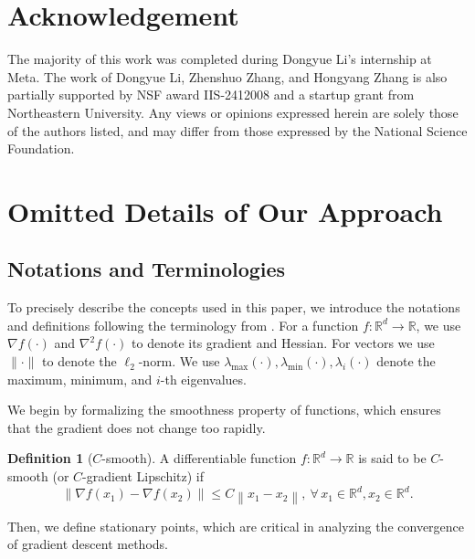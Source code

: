 \documentclass{article}
\theoremstyle{definition}
\newtheorem{definition}[theorem]{Definition}
\newcommand{\bignorm}[1]{\left\| #1 \right\|}
\begin{document}
\section*{Acknowledgement}
 
The majority of this work was completed during Dongyue Li's internship at Meta.
The work of Dongyue Li, Zhenshuo Zhang, and Hongyang Zhang is also partially supported by NSF award IIS-2412008 and a startup grant from Northeastern University. Any views or opinions expressed herein are solely those of the authors listed, and may differ from those expressed by the National Science Foundation.












\newpage
\appendix
\onecolumn
\section{Omitted Details of Our Approach}\label{sec_approach_details}

\subsection{Notations and Terminologies}

To precisely describe the concepts used in this paper, we introduce the notations and definitions following the terminology from \cite{jin2017escape}.   
For a function $f:\mathbb{R}^d \to \mathbb{R}$, we use 
$\nabla f(\cdot)$ and $\nabla^2 f(\cdot)$ to denote its gradient and Hessian.  For vectors we use $\|\cdot\|$ to denote the $\ell_2$-norm.  
We use $\lambda_{\max}(\cdot), \lambda_{\min}(\cdot), \lambda_i(\cdot)$ denote the maximum, minimum, and $i$-th eigenvalues.

We begin by formalizing the smoothness property of functions, which ensures that the gradient does not change too rapidly.
\begin{definition}[$C$-smooth]
A differentiable function $f:\mathbb{R}^d \to \mathbb{R}$ is said to be 
$C$-smooth (or $C$-gradient Lipschitz) if
\[
\bignorm{\nabla f(x_1) - \nabla f(x_2)} \leq C  \bignorm{x_1 - x_2},
~ \forall\, x_1 \in \mathbb{R}^d, x_2 \in \mathbb{R}^d.
\]
\end{definition}
Then, we define stationary points, which are critical in analyzing the convergence of gradient descent methods.
\end{document}
